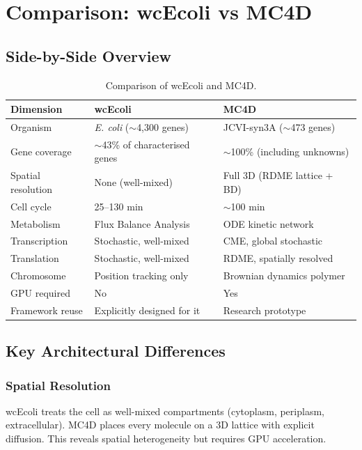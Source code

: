 \documentclass[11pt,a4paper]{report}
\begin{document}
\chapter{Comparison: wcEcoli vs MC4D}

\section{Side-by-Side Overview}

\begin{table}[h]
\centering
\small
\begin{tabular}{lll}
\toprule
\textbf{Dimension} & \textbf{wcEcoli} & \textbf{MC4D} \\
\midrule
Organism & \emph{E. coli} ($\sim$4,300 genes) & JCVI-syn3A ($\sim$473 genes) \\
Gene coverage & $\sim$43\% of characterised genes & $\sim$100\% (including unknowns) \\
Spatial resolution & None (well-mixed) & Full 3D (RDME lattice + BD) \\
Cell cycle & 25--130 min & $\sim$100 min \\
Metabolism & Flux Balance Analysis & ODE kinetic network \\
Transcription & Stochastic, well-mixed & CME, global stochastic \\
Translation & Stochastic, well-mixed & RDME, spatially resolved \\
Chromosome & Position tracking only & Brownian dynamics polymer \\
GPU required & No & Yes \\
Framework reuse & Explicitly designed for it & Research prototype \\
\bottomrule
\end{tabular}
\caption{Comparison of wcEcoli and MC4D.}
\end{table}

\section{Key Architectural Differences}

\subsection{Spatial Resolution}

wcEcoli treats the cell as well-mixed compartments (cytoplasm, periplasm, extracellular). MC4D places every molecule on a 3D lattice with explicit diffusion. This reveals spatial heterogeneity but requires GPU acceleration.
\end{document}
